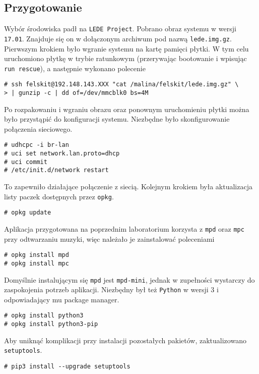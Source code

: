 \documentclass[10pt,a4paper]{article}
\begin{document}
\subsection{Przygotowanie}
Wybór środowiska padł na \texttt{LEDE Project}. Pobrano obraz systemu w wersji \texttt{17.01}. Znajduje się on w dołączonym archiwum pod nazwą \texttt{lede.img.gz}.\\[\baselineskip]
Pierwszym krokiem było wgranie systemu na kartę pamięci płytki. W tym celu uruchomiono płytkę w trybie ratunkowym (przerywając bootowanie i wpisując \texttt{run rescue}), a następnie wykonano polecenie
\begin{lstlisting}[style=bash, commentstyle=\color{black}]
# ssh felskit@192.148.143.XXX "cat /malina/felskit/lede.img.gz" \
> | gunzip -c | dd of=/dev/mmcblk0 bs=4M
\end{lstlisting}
Po rozpakowaniu i wgraniu obrazu oraz ponownym uruchomieniu płytki można było przystąpić do konfiguracji systemu. Niezbędne było skonfigurowanie połączenia sieciowego.
\begin{lstlisting}[style=bash, commentstyle=\color{black}]
# udhcpc -i br-lan
# uci set network.lan.proto=dhcp
# uci commit
# /etc/init.d/network restart
\end{lstlisting}
To zapewniło działające połączenie z siecią. Kolejnym krokiem była aktualizacja listy paczek dostępnych przez \texttt{opkg}.
\begin{lstlisting}[style=bash, commentstyle=\color{black}]
# opkg update
\end{lstlisting}
Aplikacja przygotowana na poprzednim laboratorium korzysta z \texttt{mpd} oraz \texttt{mpc} przy odtwarzaniu muzyki, więc należało je zainstalować poleceniami
\begin{lstlisting}[style=bash, commentstyle=\color{black}]
# opkg install mpd
# opkg install mpc
\end{lstlisting}
Domyślnie instalującym się \texttt{mpd} jest \texttt{mpd-mini}, jednak w zupełności wystarczy do zaspokojenia potrzeb aplikacji. Niezbędny był też \texttt{Python} w wersji 3 i odpowiadający mu package manager.
\begin{lstlisting}[style=bash, commentstyle=\color{black}]
# opkg install python3
# opkg install python3-pip
\end{lstlisting}
\newpage\noindent
Aby uniknąć komplikacji przy instalacji pozostałych pakietów, zaktualizowano \texttt{setuptools}.
\begin{lstlisting}[style=bash, commentstyle=\color{black}]
# pip3 install --upgrade setuptools
\end{lstlisting}
\end{document}
